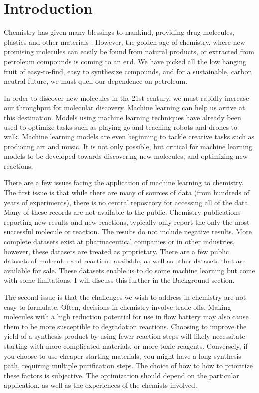 \chapter{Introduction}
\thispagestyle{plain}

Chemistry has given many blessings to mankind, providing drug molecules, plastics and other materials \cite{napoleons_buttons}. However, the golden age of chemistry, where new promising molecules can easily be found from natural products, or extracted from petroleum compounds is coming to an end. We have picked all the low hanging fruit of easy-to-find, easy to synthesize compounds, and for a sustainable, carbon neutral future, we must quell our dependence on petroleum.

In order to discover new molecules in the 21st century, we must rapidly increase our throughput for molecular discovery. Machine learning can help us arrive at this destination. Models using machine learning techniques have already been used to optimize tasks such as playing go and teaching robots and drones to walk. Machine learning models are even beginning to tackle creative tasks such as producing art and music. It is not only possible, but critical for machine learning models to be developed towards discovering new molecules, and optimizing new reactions.

There are a few issues facing the application of machine learning to chemistry. The first issue is that while there are many of sources of data (from hundreds of years of experiments), there is no central repository for accessing all of the data. Many of these records are not available to the public. Chemistry publications reporting new results and new reactions, typically only report the only the most successful molecule or reaction. The results do not include negative results. More complete datasets exist at pharmaceutical companies or in other industries, however, these datasets are treated as  proprietary. There are a few public datasets of molecules and reactions available, as well as other datasets that are available for sale. These datasets enable us to do some machine learning but come with some limitations. I will discuss this further in the Background section.

The second issue is that the challenges we wish to address in chemistry are not easy to formulate. Often, decisions in chemistry involve trade offs. Making molecules with a high reduction potential for use in flow battery may also cause them to be more susceptible to degradation reactions.\cite{tabor_2018} Choosing to improve the yield of a synthesis product by using fewer reaction steps will likely necessitate starting with more complicated materials, or more toxic reagents. Conversely, if you choose to use cheaper starting materials, you might have a long synthesis path, requiring multiple purification steps. The choice of how to how to prioritize these factors is subjective. The optimization should depend on the particular application, as well as the experiences of the chemists involved.


